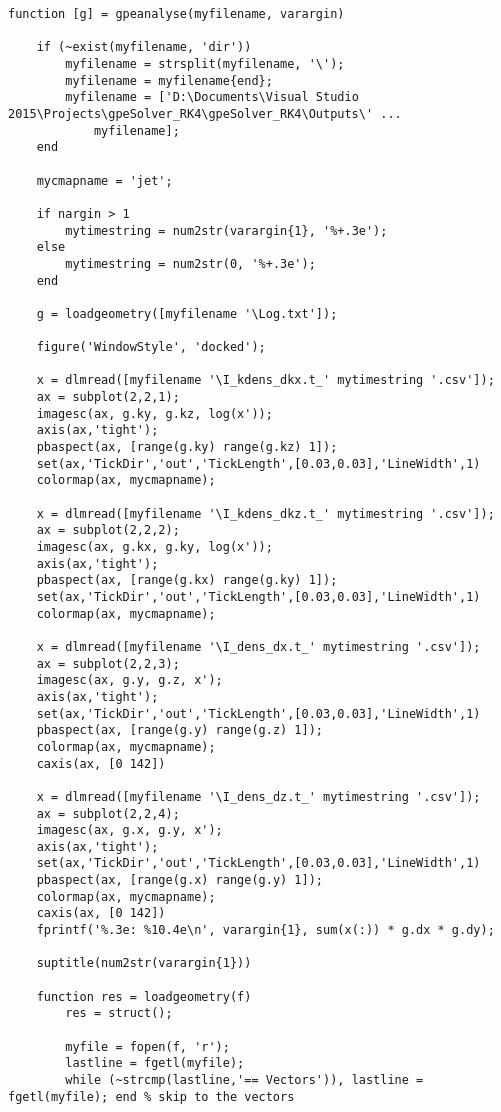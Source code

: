 \documentclass{jakedoc}
\begin{document}
\begin{lstlisting}
function [g] = gpeanalyse(myfilename, varargin)
 
    if (~exist(myfilename, 'dir'))
        myfilename = strsplit(myfilename, '\');
        myfilename = myfilename{end};
        myfilename = ['D:\Documents\Visual Studio 2015\Projects\gpeSolver_RK4\gpeSolver_RK4\Outputs\' ...
            myfilename];
    end
    
    mycmapname = 'jet';
    
    if nargin > 1
        mytimestring = num2str(varargin{1}, '%+.3e');
    else
        mytimestring = num2str(0, '%+.3e');
    end
 
    g = loadgeometry([myfilename '\Log.txt']);
    
    figure('WindowStyle', 'docked');
 
    x = dlmread([myfilename '\I_kdens_dkx.t_' mytimestring '.csv']);
    ax = subplot(2,2,1);
    imagesc(ax, g.ky, g.kz, log(x')); 
    axis(ax,'tight');
    pbaspect(ax, [range(g.ky) range(g.kz) 1]);
    set(ax,'TickDir','out','TickLength',[0.03,0.03],'LineWidth',1)
    colormap(ax, mycmapname);
    
    x = dlmread([myfilename '\I_kdens_dkz.t_' mytimestring '.csv']);
    ax = subplot(2,2,2);
    imagesc(ax, g.kx, g.ky, log(x')); 
    axis(ax,'tight'); 
    pbaspect(ax, [range(g.kx) range(g.ky) 1]);
    set(ax,'TickDir','out','TickLength',[0.03,0.03],'LineWidth',1)
    colormap(ax, mycmapname);
    
    x = dlmread([myfilename '\I_dens_dx.t_' mytimestring '.csv']);
    ax = subplot(2,2,3);
    imagesc(ax, g.y, g.z, x'); 
    axis(ax,'tight');
    set(ax,'TickDir','out','TickLength',[0.03,0.03],'LineWidth',1)
    pbaspect(ax, [range(g.y) range(g.z) 1]);
    colormap(ax, mycmapname);    
    caxis(ax, [0 142])
    
    x = dlmread([myfilename '\I_dens_dz.t_' mytimestring '.csv']);
    ax = subplot(2,2,4);
    imagesc(ax, g.x, g.y, x'); 
    axis(ax,'tight');
    set(ax,'TickDir','out','TickLength',[0.03,0.03],'LineWidth',1)
    pbaspect(ax, [range(g.x) range(g.y) 1]);
    colormap(ax, mycmapname);
    caxis(ax, [0 142])
    fprintf('%.3e: %10.4e\n', varargin{1}, sum(x(:)) * g.dx * g.dy);
    
    suptitle(num2str(varargin{1}))
    
    function res = loadgeometry(f)
        res = struct();
        
        myfile = fopen(f, 'r');
        lastline = fgetl(myfile);
        while (~strcmp(lastline,'== Vectors')), lastline = fgetl(myfile); end % skip to the vectors
        

\end{lstlisting}
\end{document}
